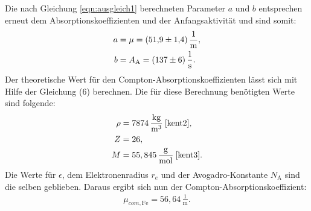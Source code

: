 \noindent Die nach Gleichung \eqref{eqn:ausgleich1} berechneten Parameter $a$ und $b$ entsprechen erneut dem Absorptionskoeffizienten und der Anfangsaktivität und sind somit:
\begin{align*}
a &= \mu = (\num{51.9 +- 1.4})\,\frac{1}{\si{\meter}} ,\\
b &= A_\text{A} = (\num{137 +- 6})\,\frac{1}{\si{\second}}.
\end{align*}
Der theoretische Wert für den Compton-Absorptionskoeffizienten lässt sich mit Hilfe der Gleichung (6) berechnen.
Die für diese Berechnung benötigten Werte sind folgende:
\begin{align*}
\rho &= 7874\,\frac{\si{\kilo\gram}}{\si{\cubic\meter}}\:\text{\cite{kent2}},\\
Z &= 26 ,\\
M &= 55,845\,\frac{\si{\gram}}{\si{\mol}}\: \text{\cite{kent3}}.
\end{align*}
Die Werte für $\epsilon$, dem Elektronenradius $r_e$ und der Avogadro-Konstante $N_\text{A}$ sind die selben geblieben.
Daraus ergibt sich nun der Compton-Absorptionskoeffizient:
\begin{align*}
  \mu_{com, \text{Fe}} = 56,64\,\frac{1}{\si{\meter}}.
\end{align*}

